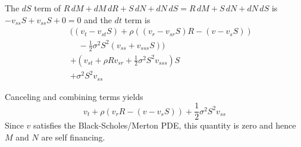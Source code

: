 \documentclass{article}
\newcommand{\onehalf}{\frac{1}{2}}
\begin{document}
The $dS$ term of $R\,dM + dM\,dR + S\,dN + dN\,dS = R\,dM + S\,dN + dN\,dS$ is 
$-v_{ss}S + v_{ss}S + 0= 0$
and the $dt$ term is
\begin{eqnarray*}
&&\bigl((v_t - v_{st}S) + \rho((v_r - v_{sr}S)R - (v - v_s S)) \\
&&\quad -\onehalf\sigma^2 S^2(v_{ss} + v_{sss}S)\bigr)\\ 
&&+ (v_{st} + \rho R v_{sr} + \onehalf \sigma^2 S^2 v_{sss})S\\
&&+ \sigma^2 S^2 v_{ss}
\end{eqnarray*}

Canceling and combining terms yields
\begin{equation*}
v_t + \rho(v_r R - (v - v_s S))
+\onehalf\sigma^2 S^2v_{ss}
\end{equation*}
Since $v$ satisfies the Black-Scholes/Merton PDE, this
quantity is zero and hence $M$ and $N$ are
self financing.



%
\end{document}
